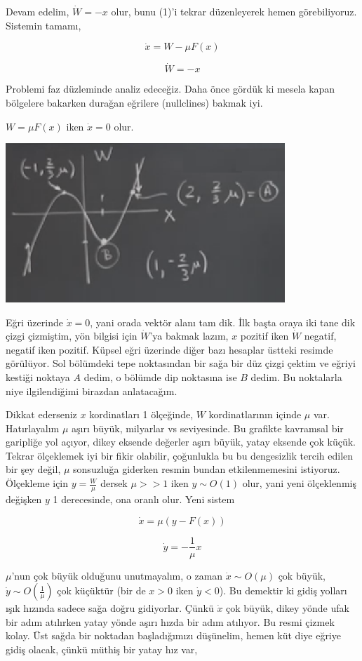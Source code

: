 \documentclass[12pt,fleqn]{article}\usepackage{../../common}
\begin{document}
Devam edelim, $\dot{W} = -x$ olur, bunu (1)'i tekrar düzenleyerek hemen
görebiliyoruz. Sistemin tamamı,

$$ \dot{x} = W - \mu F(x) $$

$$ \dot{W} = -x $$

Problemi faz düzleminde analiz edeceğiz. Daha önce gördük ki mesela kapan
bölgelere bakarken durağan eğrilere (nullclines) bakmak iyi.

$W = \mu F(x)$ iken $\dot{x} = 0$ olur.

\includegraphics[height=6cm]{10_01.png}

Eğri üzerinde $\dot{x} = 0$, yani orada vektör alanı tam dik. İlk başta oraya
iki tane dik çizgi çizmiştim, yön bilgisi için $\dot{W}$'ya bakmak lazım, $x$
pozitif iken $\dot{W}$ negatif, negatif iken pozitif. Küpsel eğri üzerinde diğer
bazı hesaplar üstteki resimde görülüyor. Sol bölümdeki tepe noktasından bir
sağa bir düz çizgi çektim ve eğriyi kestiği noktaya $A$ dedim, o bölümde dip
noktasına ise $B$ dedim. Bu noktalarla niye ilgilendiğimi birazdan anlatacağım. 

Dikkat ederseniz $x$ kordinatları 1 ölçeğinde, $W$ kordinatlarının içinde $\mu$
var. Hatırlayalım $\mu$ aşırı büyük, milyarlar vs seviyesinde. Bu grafikte
kavramsal bir garipliğe yol açıyor, dikey eksende değerler aşırı büyük, yatay
eksende çok küçük. Tekrar ölçeklemek iyi bir fikir olabilir, çoğunlukla bu bu
dengesizlik tercih edilen bir şey değil, $\mu$ sonsuzluğa giderken resmin bundan
etkilenmemesini istiyoruz. Ölçekleme için $y = \frac{W}{\mu}$ dersek $\mu >> 1$
iken $y \sim O(1)$ olur, yani yeni ölçeklenmiş değişken $y$ 1 derecesinde,
ona oranlı olur. Yeni sistem

$$ \dot{x} = \mu(y -  F(x)) $$

$$ \dot{y} = -\frac{1}{\mu} x $$


$\mu$'nun çok büyük olduğunu unutmayalım, o zaman $\dot{x} \sim O(\mu)$ çok
büyük, $\dot{y} \sim O(\frac{1}{\mu})$ çok küçüktür (bir de $x>0$ iken $\dot{y}
< 0$). Bu demektir ki gidiş yolları ışık hızında sadece sağa doğru
gidiyorlar. Çünkü $\dot{x}$ çok büyük, dikey yönde ufak bir adım atılırken yatay
yönde aşırı hızda bir adım atılıyor. Bu resmi çizmek kolay. Üst sağda bir
noktadan başladığımızı düşünelim, hemen küt diye eğriye gidiş olacak, çünkü
müthiş bir yatay hız var,
\end{document}
